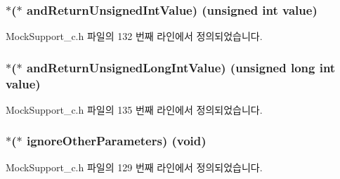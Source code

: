 \subsubsection[{\texorpdfstring{and\+Return\+Unsigned\+Int\+Value}{andReturnUnsignedIntValue}}]{$\ast$($\ast$ and\+Return\+Unsigned\+Int\+Value) (unsigned int value)}\hypertarget{struct_s_mock_expected_call__c_a191e66325acd3a6d6f8712f9223de74b}{}\label{struct_s_mock_expected_call__c_a191e66325acd3a6d6f8712f9223de74b}


Mock\+Support\+\_\+c.\+h 파일의 132 번째 라인에서 정의되었습니다.

\subsubsection[{\texorpdfstring{and\+Return\+Unsigned\+Long\+Int\+Value}{andReturnUnsignedLongIntValue}}]{$\ast$($\ast$ and\+Return\+Unsigned\+Long\+Int\+Value) (unsigned long int value)}\hypertarget{struct_s_mock_expected_call__c_a63b7a9e5b322192fb2223ac3c431842f}{}\label{struct_s_mock_expected_call__c_a63b7a9e5b322192fb2223ac3c431842f}


Mock\+Support\+\_\+c.\+h 파일의 135 번째 라인에서 정의되었습니다.

\subsubsection[{\texorpdfstring{ignore\+Other\+Parameters}{ignoreOtherParameters}}]{$\ast$($\ast$ ignore\+Other\+Parameters) (void)}\hypertarget{struct_s_mock_expected_call__c_aa35b2f02d1f20738316c5f8eef9de30c}{}\label{struct_s_mock_expected_call__c_aa35b2f02d1f20738316c5f8eef9de30c}


Mock\+Support\+\_\+c.\+h 파일의 129 번째 라인에서 정의되었습니다.

